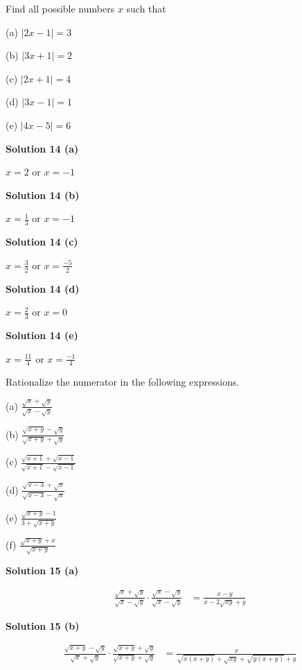 \begin{tcolorbox}[title=Problem 14, breakable]
    Find all possible numbers $x$ such that 

    (a) $|2x - 1| = 3$

    (b) $|3x + 1| = 2$

    (c) $|2x + 1| = 4$

    (d) $|3x - 1| = 1$

    (e) $|4x - 5| = 6$
\end{tcolorbox}

\textbf{Solution 14 (a)}

$x = 2$ or $x = -1$

\textbf{Solution 14 (b)}

$x = \frac{1}{3}$ or $x = -1$

\textbf{Solution 14 (c)}

$x = \frac{3}{2}$ or $x = \frac{-5}{2}$

\textbf{Solution 14 (d)}

$x = \frac{2}{3}$ or $x = 0$

\textbf{Solution 14 (e)}

$x = \frac{11}{4}$ or $x = \frac{-1}{4}$

\begin{tcolorbox}[title=Problem 15, breakable]
    Rationalize the numerator in the following expressions.

    (a) $\frac{\sqrt{x} + \sqrt{y}}{\sqrt{x} - \sqrt{y}}$

    (b) $\frac{\sqrt{x + y} - \sqrt{y}}{\sqrt{x + y} + \sqrt{y}}$

    (c) $\frac{\sqrt{x + 1} + \sqrt{x - 1}}{\sqrt{x + 1} - \sqrt{x - 1}}$

    (d) $\frac{\sqrt{x - 3} + \sqrt{x}}{\sqrt{x - 3} - \sqrt{x}}$

    (e) $\frac{\sqrt{x + y} - 1}{3 + \sqrt{x + y}}$

    (f) $\frac{\sqrt{x + y} + x}{\sqrt{x + y}}$
\end{tcolorbox}

\textbf{Solution 15 (a)}

\begin{align*}
    \frac{\sqrt{x} + \sqrt{y}}{\sqrt{x} - \sqrt{y}} \cdot \frac{\sqrt{x} - \sqrt{y}}{\sqrt{x} - \sqrt{y}}
        &= \frac{x - y}{x - 2\sqrt{xy} + y}
\end{align*}

\textbf{Solution 15 (b)}

\begin{align*}
    \frac{\sqrt{x + y} - \sqrt{y}}{\sqrt{x} + \sqrt{y}} \cdot \frac{\sqrt{x + y} + \sqrt{y}}{\sqrt{x + y} + \sqrt{y}}
        &= \frac{x}{\sqrt{x(x + y)} + \sqrt{xy} + \sqrt{y(x + y)} + y}
\end{align*}


